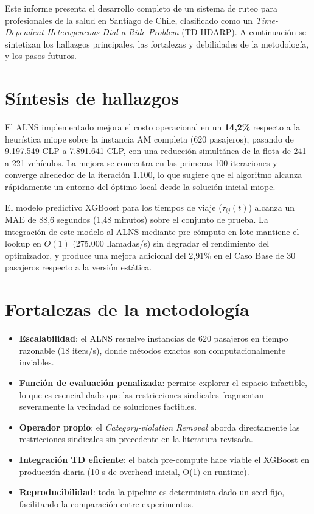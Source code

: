 Este informe presenta el desarrollo completo de un sistema de ruteo para profesionales de la salud en Santiago de Chile, clasificado como un \textit{Time-Dependent Heterogeneous Dial-a-Ride Problem} (TD-HDARP). A continuación se sintetizan los hallazgos principales, las fortalezas y debilidades de la metodología, y los pasos futuros.

\section{Síntesis de hallazgos}

El ALNS implementado mejora el costo operacional en un \textbf{14,2\%} respecto a la heurística miope sobre la instancia AM completa (620 pasajeros), pasando de 9.197.549 CLP a 7.891.641 CLP, con una reducción simultánea de la flota de 241 a 221 vehículos. La mejora se concentra en las primeras 100 iteraciones y converge alrededor de la iteración 1.100, lo que sugiere que el algoritmo alcanza rápidamente un entorno del óptimo local desde la solución inicial miope.

El modelo predictivo XGBoost para los tiempos de viaje ($\tau_{ij}(t)$) alcanza un MAE de 88,6 segundos (1,48 minutos) sobre el conjunto de prueba. La integración de este modelo al ALNS mediante pre-cómputo en lote mantiene el lookup en $O(1)$ (275.000 llamadas/s) sin degradar el rendimiento del optimizador, y produce una mejora adicional del 2,91\% en el Caso Base de 30 pasajeros respecto a la versión estática.

\section{Fortalezas de la metodología}

\begin{itemize}
    \item \textbf{Escalabilidad}: el ALNS resuelve instancias de 620 pasajeros en tiempo razonable (18 iters/s), donde métodos exactos son computacionalmente inviables.
    \item \textbf{Función de evaluación penalizada}: permite explorar el espacio infactible, lo que es esencial dado que las restricciones sindicales fragmentan severamente la vecindad de soluciones factibles.
    \item \textbf{Operador propio}: el \textit{Category-violation Removal} aborda directamente las restricciones sindicales sin precedente en la literatura revisada.
    \item \textbf{Integración TD eficiente}: el batch pre-compute hace viable el XGBoost en producción diaria (10 s de overhead inicial, O(1) en runtime).
    \item \textbf{Reproducibilidad}: toda la pipeline es determinista dado un seed fijo, facilitando la comparación entre experimentos.
\end{itemize}

